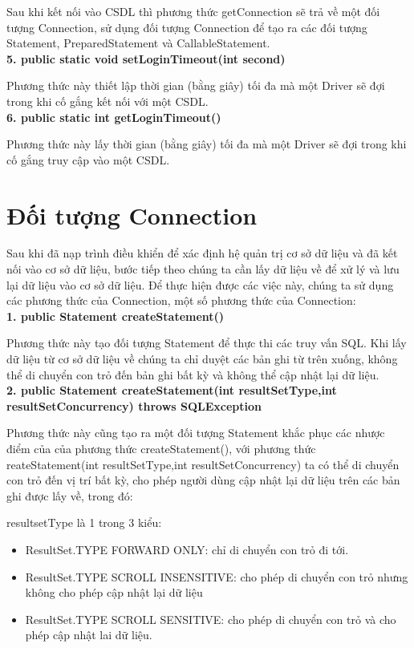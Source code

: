 Sau khi kết nối vào CSDL thì phương thức getConnection sẽ trả về một đối tượng Connection, sử dụng đối tượng Connection để tạo ra  các đối tượng Statement, PreparedStatement và CallableStatement.\\
\textbf{5. public static void setLoginTimeout(int second)}

Phương thức này thiết lập thời gian (bằng giây) tối đa mà một Driver sẽ đợi trong khi cố gắng kết nối với một CSDL.\\
\textbf{6. public static int getLoginTimeout()}

Phương thức này lấy thời gian (bằng giây) tối đa mà một Driver sẽ đợi trong khi cố gắng truy cập vào một CSDL.
\section{Đối tượng Connection}
Sau khi đã nạp trình điều khiển để xác định hệ quản trị cơ sở dữ liệu và đã kết nối vào cơ sở dữ liệu, bước tiếp theo chúng ta cần  lấy dữ liệu về để xử lý và lưu lại dữ liệu vào cơ sở dữ liệu. Để thực hiện được các việc này, chúng ta sử dụng các phương thức của Connection, một số phương thức của Connection:\\ 
\textbf{1. public Statement createStatement()}

Phương thức này tạo đối tượng Statement để thực thi các truy vấn SQL. Khi lấy dữ liệu từ cơ sở dữ liệu về chúng ta chỉ duyệt các bản ghi từ trên xuống, không thể di chuyển con trỏ đến bản ghi bất kỳ và không thể cập nhật lại dữ liệu.\\
\textbf{2. public Statement createStatement(int resultSetType,int resultSetConcurrency) throws SQLException}

Phương thức này cũng tạo ra một đối tượng Statement khắc phục các nhược điểm của của phương thức createStatement(), với phương thức reateStatement(int resultSetType,int resultSetConcurrency) ta có thể di chuyển con trỏ đến vị trí bất kỳ, cho phép người dùng cập nhật lại dữ liệu trên các bản ghi được lấy về, trong đó:

resultsetType là 1 trong 3 kiểu:
\begin{itemize}
	\item ResultSet.TYPE \text{\_}FORWARD \text{\_}ONLY: chỉ di chuyển con trỏ đi tới.
	\item ResultSet.TYPE \text{\_}SCROLL \text{\_}INSENSITIVE: cho phép di chuyển con trỏ nhưng không cho phép cập nhật lại dữ liệu
	\item ResultSet.TYPE \text{\_}SCROLL \text{\_}SENSITIVE: cho phép di chuyển con trỏ và cho phép cập nhật lai dữ liệu.
\end{itemize}

